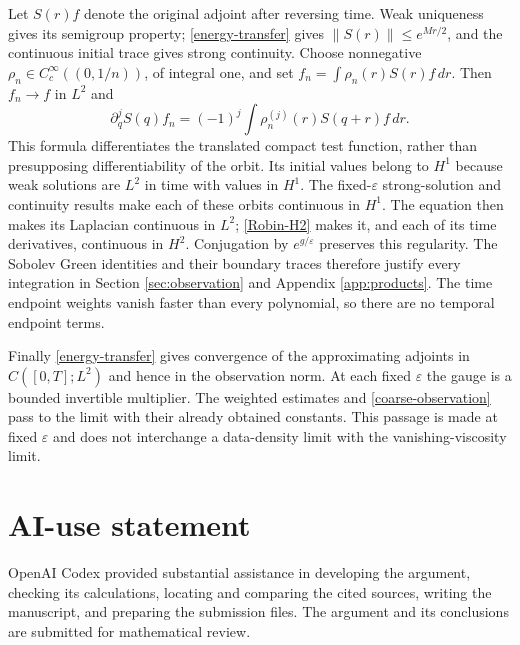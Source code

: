 \documentclass[11pt]{article}
\theoremstyle{remark}
\newcommand{\eps}{\varepsilon}
\begin{document}
Let $S(r)f$ denote the original adjoint after reversing time. Weak uniqueness
gives its semigroup property; \eqref{energy-transfer} gives
$\|S(r)\|\le e^{Mr/2}$, and the continuous initial trace gives strong
continuity. Choose nonnegative
$\rho_n\in C_c^\infty((0,1/n))$, of integral one, and set
$f_n=\int\rho_n(r)S(r)f\,dr$. Then $f_n\to f$ in $L^2$ and
\begin{equation}\label{time-smoothing}
 \partial_q^j S(q)f_n=(-1)^j\int\rho_n^{(j)}(r)S(q+r)f\,dr.
\end{equation}
This formula differentiates the translated compact test function, rather
than presupposing differentiability of the orbit. Its initial values belong
to $H^1$ because weak solutions are $L^2$ in time with values in $H^1$.
The fixed-$\eps$ strong-solution and continuity results
\cite[Propositions 3.6 and 3.9]{Outward} make each of these orbits continuous
in $H^1$. The equation then makes its Laplacian continuous in $L^2$;
\eqref{Robin-H2} makes it, and each of its time derivatives, continuous in
$H^2$. Conjugation by $e^{g/\eps}$ preserves this regularity. The Sobolev
Green identities and their boundary traces therefore justify every
integration in Section \ref{sec:observation} and Appendix \ref{app:products}.
The time endpoint weights vanish faster than every polynomial, so there
are no temporal endpoint terms.

Finally \eqref{energy-transfer} gives convergence of the approximating
adjoints in $C([0,T];L^2)$ and hence in the observation norm. At each fixed
$\eps$ the gauge is a bounded invertible multiplier. The weighted estimates
and \eqref{coarse-observation} pass to the limit with their already obtained
constants. This passage is made at fixed $\eps$ and does not interchange a
data-density limit with the vanishing-viscosity limit.

\section*{AI-use statement}
OpenAI Codex provided substantial assistance in developing the argument,
checking its calculations, locating and comparing the cited sources, writing
the manuscript, and preparing the submission files. The argument and its
conclusions are submitted for mathematical review.
\end{document}
